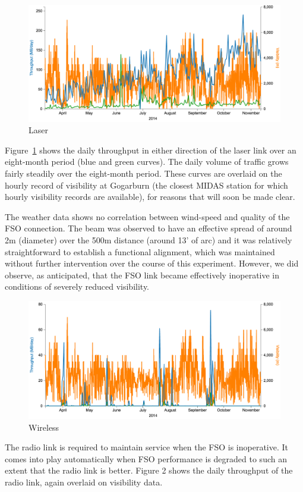 \begin{figure}
  \centering
  \includegraphics[width=\textwidth]{results/fig1-Laser-12-Apr-12-Nov}
  \caption{Laser}
  \label{fig:throughput_laser}
\end{figure}
Figure~\ref{fig:throughput_laser} shows the daily throughput in either
direction of the laser link over an eight-month period (blue and green
curves). The daily volume of traffic grows fairly steadily over the
eight-month period. These curves are overlaid on the hourly record of
visibility at Gogarburn (the closest MIDAS station for which hourly
visibility records are available), for reasons that will soon be made
clear.

The weather data shows no correlation between wind-speed and quality
of the FSO connection. The beam was observed to have an effective
spread of around 2m (diameter) over the 500m distance (around 13’ of
arc) and it was relatively straightforward to establish a functional
alignment, which was maintained without further intervention over the
course of this experiment. However, we did observe, as anticipated,
that the FSO link became effectively inoperative in conditions of
severely reduced visibility.

\begin{figure}
  \centering
  \includegraphics[width=\textwidth]{results/fig2-Wireless-12-Apr-12-Nov}
  \caption{Wireless}
  \label{fig:throughput_wireless}
\end{figure}
The radio link is required to maintain service when the FSO is
inoperative. It comes into play automatically when FSO performance is
degraded to such an extent that the radio link is better. Figure 2
shows the daily throughput of the radio link, again overlaid on
visibility data.

